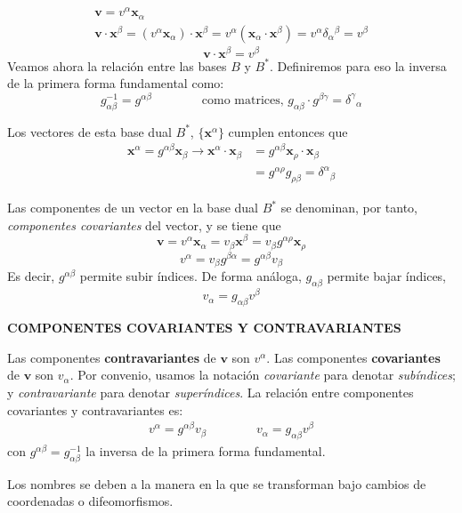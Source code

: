 \begin{gather*}
    \mathbf{v}=v^\alpha \mathbf{x}_\alpha \\
    \mathbf{v} \cdot \mathbf{x}^\beta=(v^\alpha \mathbf{x}_\alpha) \cdot \mathbf{x}^\beta =v^\alpha (\mathbf{x}_\alpha \cdot \mathbf{x}^\beta)=v^\alpha \delta _\alpha {}^\beta =v^\beta
\end{gather*}
$$
\boxed{\mathbf{v}\cdot \mathbf{x}^\beta=v^\beta}
$$
Veamos ahora la relación entre las bases $B$ y $B^*$. Definiremos para eso la inversa de la primera forma fundamental como:
$$
g_{\alpha \beta }^{-1}=g^{\alpha \beta } \qquad \qquad \text{como matrices, }g_{\alpha \beta} \cdot g^{\beta \gamma}=\delta ^\gamma {}_\alpha
$$

Los vectores de esta base dual $B^*$, $\{ \mathbf{x}^\alpha \}$ cumplen entonces que 
\begin{equation*}
    \begin{split}
        \mathbf{x}^\alpha=g^{\alpha \beta} \mathbf{x}_\beta \longrightarrow \mathbf{x}^\alpha \cdot \mathbf{x}_\beta &=g^{\alpha \beta}\mathbf{x}_\rho \cdot \mathbf{x}_\beta\\
        &=g^{\alpha \rho}g_{\rho \beta} =\delta ^\alpha {}_\beta 
    \end{split}
\end{equation*}

Las componentes de un vector en la base dual $B^*$ se denominan, por tanto, \emph{componentes covariantes} del vector, y se tiene que 
$$
\mathbf{v}=v^\alpha \mathbf{x}_\alpha =v_\beta \mathbf{x}^\beta =v_\beta g^{\alpha \rho}\mathbf{x}_\rho 
$$
$$
\boxed{v^\alpha =v_\beta g^{\beta \alpha} =g^{\alpha\beta}v_\beta}
$$
Es decir, $g^{\alpha \beta}$ permite subir índices. De forma análoga, $g_{\alpha \beta}$ permite bajar índices,
$$
v_\alpha =g_{\alpha \beta} v^\beta
$$
\begin{mybox}
    \begin{center}
        \textbf{COMPONENTES COVARIANTES Y CONTRAVARIANTES}
    \end{center}
    Las componentes \textbf{contravariantes} de $\mathbf{v}$ son $v^\alpha$. Las componentes \textbf{covariantes} de $\mathbf{v}$ son $v_\alpha$. Por convenio, usamos la notación \emph{covariante} para denotar \emph{subíndices}; y \emph{contravariante} para denotar \emph{superíndices}. La relación entre componentes covariantes y contravariantes es:
    \begin{gather*}
        v^\alpha=g^{\alpha\beta}v_\beta \qquad \qquad v_\alpha =g_{\alpha \beta} v^\beta
    \end{gather*}
    con $g^{\alpha \beta }=g_{\alpha \beta }^{-1} $ la inversa de la primera forma fundamental.
\end{mybox}
Los nombres se deben a la manera en la que se transforman bajo cambios de coordenadas o difeomorfismos.\\

